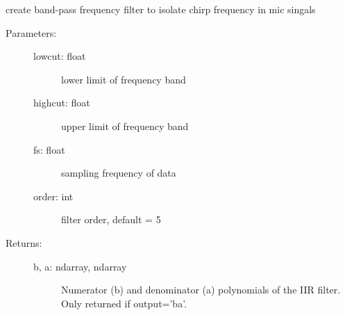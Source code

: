 \documentclass[letterpaper,10pt,english]{sphinxmanual}
\begin{document}
\begin{fulllineitems}
\label{\detokenize{code:ATom.atom_functions.butter_bandpass}}
create band-pass frequency filter to isolate chirp frequency in mic singals
\begin{description}
\item[{Parameters:}] \leavevmode\begin{description}
\item[{lowcut: float}] \leavevmode
lower limit of frequency band

\item[{highcut: float}] \leavevmode
upper limit of frequency band

\item[{fs: float}] \leavevmode
sampling frequency of data

\item[{order: int}] \leavevmode
filter order, default = 5

\end{description}

\item[{Returns:}] \leavevmode\begin{description}
\item[{b, a: ndarray, ndarray}] \leavevmode
Numerator (b) and denominator (a) polynomials of the IIR filter. Only returned if output=’ba’.

\end{description}

\end{description}

\end{fulllineitems}

\end{document}
